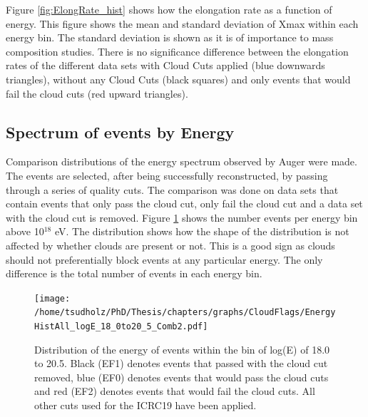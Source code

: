 Figure \ref{fig:ElongRate_hist} shows how the elongation rate as a function of energy. This figure shows the mean and standard deviation of Xmax within each energy bin. The standard deviation is shown as it is of importance to mass composition studies. There is no significance difference between the elongation  rates of the different data sets with Cloud Cuts applied (blue downwards triangles), without any Cloud Cuts (black squares) and only events that would fail the cloud cuts (red upward triangles).


\subsection{Spectrum of events by Energy}

Comparison distributions of the energy spectrum observed by Auger were made. The events are selected, after being successfully reconstructed, by passing through a series of quality cuts. The comparison was done on data sets that contain events that only pass the cloud cut, only fail the cloud cut and a data set with the cloud cut is removed. Figure \ref{fig:cloudFlag_energyDist} shows the number events per energy bin above 10$^{18}$ eV. The distribution shows how the shape of the distribution is not affected by whether clouds are present or not. This is a good sign as clouds should not preferentially block events at any particular energy. The only difference is the total number of events in each energy bin.

\begin{figure}[!t]
\centering
\texttt{[image: /home/tsudholz/PhD/Thesis/chapters/graphs/CloudFlags/EnergyHistAll\_logE\_18\_0to20\_5\_Comb2.pdf]}
\caption{Distribution of the energy of events within the bin of log(E) of 18.0 to 20.5. Black (EF1) denotes events that passed with the cloud cut removed, blue (EF0) denotes events that would pass the cloud cuts and red (EF2) denotes events that would fail the cloud cuts. All other cuts used for the ICRC19 have been applied.} \label{fig:cloudFlag_energyDist}
\end{figure}

